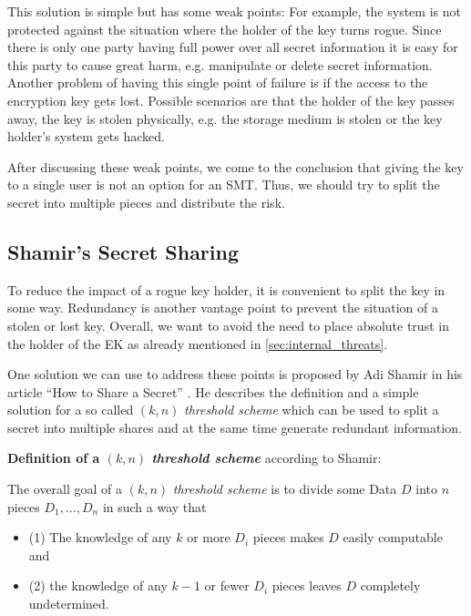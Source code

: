 \documentclass[runningheads]{llncs}
\begin{document}
This solution is simple but has some weak points:
For example, the system is not protected against the situation where the holder of the key turns rogue. Since there is only one party having full power over all secret information it is easy for this party to cause great harm, e.g. manipulate or delete secret information.
Another problem of having this single point of failure is if the access to the encryption key gets lost. Possible scenarios are that the holder of the key passes away, the key is stolen physically, e.g. the storage medium is stolen or the key holder's system gets hacked.

After discussing these weak points, we come to the conclusion that giving the key to a single user is not an option for an SMT. Thus, we should try to split the secret into multiple pieces and distribute the risk.

\subsection{Shamir's Secret Sharing}
\label{sec:shamir}

To reduce the impact of a rogue key holder, it is convenient to split the key in some way. Redundancy is another vantage point to prevent the situation of a stolen or lost key. Overall, we want to avoid the need to place absolute trust in the holder of the EK as already mentioned in \autoref{sec:internal_threats}.

One solution we can use to address these points is proposed by Adi Shamir in his article ``How to Share a Secret'' \cite{shamir}. He describes the definition and a simple solution for a so called $(k,n)$ \textit{threshold scheme} which can be used to split a secret into multiple shares and at the same time generate redundant information.
\newline

\noindent
\textbf{Definition of a $(k,n)$ \textit{threshold scheme}} according to Shamir:
\newline

\noindent
The overall goal of a $(k,n)$ \textit{threshold scheme} is to divide some Data $D$ into $n$ pieces $D_1,...,D_n$ in such a way that
\begin{itemize}
\setlength\itemsep{1mm}
\item[] (1) The knowledge of any $k$ or more $D_i$ pieces makes $D$ easily computable and
\item[] (2) the knowledge of any $k-1$ or fewer $D_i$ pieces leaves $D$ completely undetermined.
\end{itemize}
\end{document}
